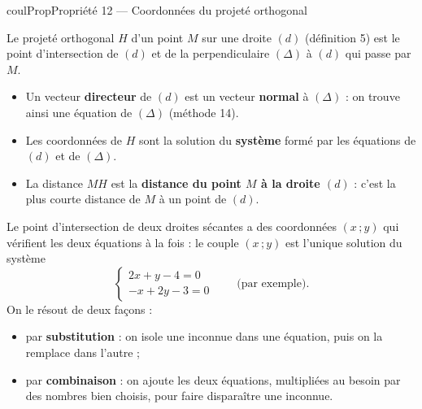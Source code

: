 \documentclass[11pt,a4paper]{article}
\makeatletter
\newcommand{\pt}[3]{\path (#1) node[croix]{} node[#2,font=\small,inner sep=2.5pt]{$#3$};}
\newcounter{lycee@signet}
\newcommand{\signet}[3][]{\stepcounter{lycee@signet}%
  \edef\lycee@dest{\if\relax\detokenize{#1}\relax
    signet.\arabic{lycee@signet}\else#1\fi}%
  \hypertarget{\lycee@dest}{}\bookmark[level=#2,dest=\lycee@dest]{#3}}
\newenvironment{proprietebox}[1][Propriété]%
  {\begin{boitecours}[phantom={\signet{2}{#1}}]{coulProp}{#1}}{\end{boitecours}}
\makeatother
\begin{document}
\begin{proprietebox}[Propriété 12 --- Coordonnées du projeté orthogonal]
\begin{minipage}[t]{0.58\linewidth}\raggedright
Le projeté orthogonal $H$ d'un point $M$ sur une droite $(d)$ (définition 5) est le point
d'intersection de $(d)$ et de la perpendiculaire $(\Delta)$ à $(d)$ qui passe par $M$.
\begin{itemize}
  \item Un vecteur \textbf{directeur} de $(d)$ est un vecteur \textbf{normal} à
        $(\Delta)$ : on trouve ainsi une équation de $(\Delta)$ (méthode 14).
  \item Les coordonnées de $H$ sont la solution du \textbf{système} formé par les
        équations de $(d)$ et de $(\Delta)$.
  \item La distance $MH$ est la \textbf{distance du point $M$ à la droite $(d)$} : c'est la
        plus courte distance de $M$ à un point de $(d)$.
\end{itemize}
\end{minipage}\hfill
\begin{minipage}[t]{0.38\linewidth}
\vspace{0pt}\centering
{}
\end{minipage}
\end{proprietebox}

\begin{remarquebox}
Le point d'intersection de deux droites sécantes a des coordonnées $(x\,;y)$ qui vérifient
les deux équations à la fois : le couple $(x\,;y)$ est l'unique solution du système
\[
  \left\{\begin{array}{l}
  2x+y-4=0\\
  -x+2y-3=0
  \end{array}\right.
  \qquad\text{(par exemple).}
\]
On le résout de deux façons :
\begin{itemize}
  \item par \textbf{substitution} : on isole une inconnue dans une équation, puis on la
        remplace dans l'autre ;
  \item par \textbf{combinaison} : on ajoute les deux équations, multipliées au besoin par
        des nombres bien choisis, pour faire disparaître une inconnue.
\end{itemize}
\end{remarquebox}
\end{document}
